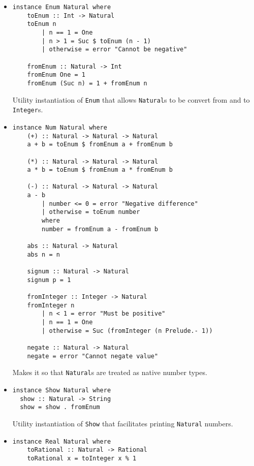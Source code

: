 \documentclass[11pt,a4paper]{article}
\begin{document}
\begin{itemize}
    \item \begin{lstlisting}
instance Enum Natural where
    toEnum :: Int -> Natural
    toEnum n
        | n == 1 = One
        | n > 1 = Suc $ toEnum (n - 1)
        | otherwise = error "Cannot be negative"
    
    fromEnum :: Natural -> Int
    fromEnum One = 1
    fromEnum (Suc n) = 1 + fromEnum n
    \end{lstlisting}

          Utility instantiation of \lstinline{Enum} that allows \lstinline{Natural}s to be convert from and to \lstinline{Integer}s.

    \item \begin{lstlisting}
instance Num Natural where
    (+) :: Natural -> Natural -> Natural
    a + b = toEnum $ fromEnum a + fromEnum b
    
    (*) :: Natural -> Natural -> Natural
    a * b = toEnum $ fromEnum a * fromEnum b
    
    (-) :: Natural -> Natural -> Natural
    a - b
        | number <= 0 = error "Negative difference"
        | otherwise = toEnum number
        where
        number = fromEnum a - fromEnum b
    
    abs :: Natural -> Natural
    abs n = n
    
    signum :: Natural -> Natural
    signum p = 1
    
    fromInteger :: Integer -> Natural
    fromInteger n
        | n < 1 = error "Must be positive"
        | n == 1 = One
        | otherwise = Suc (fromInteger (n Prelude.- 1))
    
    negate :: Natural -> Natural
    negate = error "Cannot negate value"
    \end{lstlisting}

          Makes it so that \lstinline{Natural}s are treated as native number types.

    \item \begin{lstlisting}
instance Show Natural where
  show :: Natural -> String
  show = show . fromEnum
    \end{lstlisting}

          Utility instantiation of \lstinline{Show} that facilitates printing \lstinline{Natural} numbers.

    \item \begin{lstlisting}
instance Real Natural where
    toRational :: Natural -> Rational
    toRational x = toInteger x % 1
    \end{lstlisting}


\end{itemize}
\end{document}
